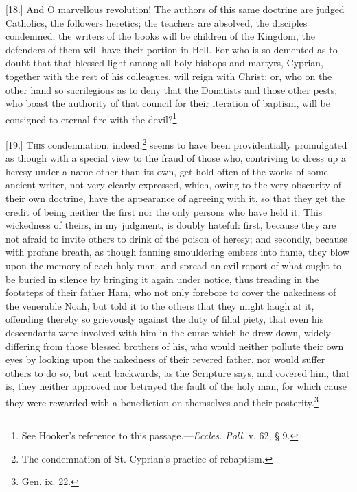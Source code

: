 [18.] And O marvellous revolution! The authors of this same doctrine are judged Catholics, the followers heretics; the teachers are absolved, the disciples condemned; the writers of the books will be children of the Kingdom, the defenders of them will have their portion in Hell. For who is so demented as to doubt that that blessed light among all holy bishops and martyrs, Cyprian, together with the rest of his colleagues, will reign with Christ; or, who on the other hand so sacrilegious as to deny that the Donatists and those other pests, who boast the authority of that council for their iteration of baptism, will be consigned to eternal fire with the devil?\footnote{See Hooker’s reference to this passage.—\emph{Eccles. Poll}. v. 62, § 9.}


[19.] \textsc{This} condemnation, indeed,\footnote{The condemnation of St. Cyprian’s practice of rebaptism.} seems to have been providentially promulgated as though with a special view to the fraud of those who, contriving to dress up a heresy under a name other than its own, get hold often of the works of some ancient writer, not very clearly expressed, which, owing to the very obscurity of their own doctrine, have the appearance of agreeing with it, so that they get the credit of being neither the first nor the only persons who have held it. This wickedness of theirs, in my judgment, is doubly hateful: first, because they are not afraid to invite others to drink of the poison of heresy; and secondly, because with profane breath, as though fanning smouldering embers into flame, they blow upon the memory of each holy man, and spread an evil report of what ought to be buried in silence by bringing it again under notice, thus treading in the footsteps of their father Ham, who not only forebore to cover the nakedness of the venerable Noah, but told it to the others that they might laugh at it, offending thereby so grievously against the duty of filial piety, that even his descendants were involved with him in the curse which he drew down, widely differing from those blessed brothers of his, who would neither pollute their own eyes by looking upon the nakedness of their revered father, nor would suffer others to do so, but went backwards, as the Scripture says, and covered him, that is, they neither approved nor betrayed the fault of the holy man, for which cause they were rewarded with a benediction on themselves and their posterity.\footnote{Gen. ix. 22.}

